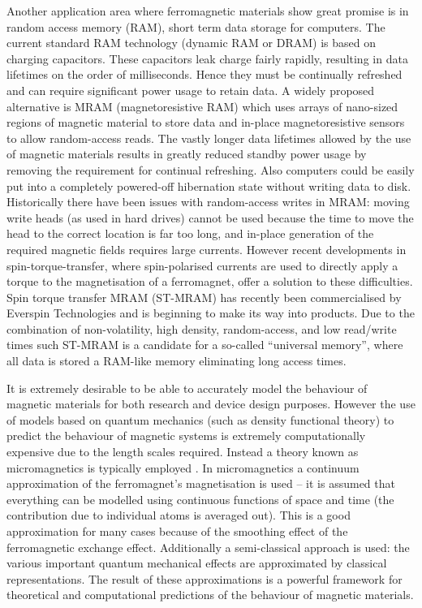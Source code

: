 Another application area where ferromagnetic materials show great promise is in random access memory (RAM), \ie short term data storage for computers.
The current standard RAM technology (dynamic RAM or DRAM) is based on charging capacitors.
These capacitors leak charge fairly rapidly, resulting in data lifetimes on the order of milliseconds.
Hence they must be continually refreshed and can require significant power usage to retain data.
A widely proposed alternative is MRAM (magnetoresistive RAM) which uses arrays of nano-sized regions of magnetic material to store data and in-place magnetoresistive sensors to allow random-access reads.
The vastly longer data lifetimes allowed by the use of magnetic materials results in greatly reduced standby power usage by removing the requirement for continual refreshing.
Also computers could be easily put into a completely powered-off hibernation state without writing data to disk.
Historically there have been issues with random-access writes in MRAM: moving write heads (as used in hard drives) cannot be used because the time to move the head to the correct location is far too long, and in-place generation of the required magnetic fields requires large currents.
However recent developments in spin-torque-transfer, where spin-polarised currents are used to directly apply a torque to the magnetisation of a ferromagnet, offer a solution to these difficulties.
Spin torque transfer MRAM (ST-MRAM) has recently been commercialised by Everspin Technologies \cite{everspin} and is beginning to make its way into products.
Due to the combination of non-volatility, high density, random-access, and low read/write times such ST-MRAM is a candidate for a so-called ``universal memory'', where all data is stored a RAM-like memory eliminating long access times.


It is extremely desirable to be able to accurately model the behaviour of magnetic materials for both research and device design purposes.
However the use of models based on quantum mechanics (such as density functional theory) to predict the behaviour of magnetic systems is extremely computationally expensive due to the length scales required.
Instead a theory known as micromagnetics is typically employed \cite{Aharoni1996}.
In micromagnetics a continuum approximation of the ferromagnet's magnetisation is used -- it is  assumed that everything can be modelled using continuous functions of space and time (\ie the contribution due to individual atoms is averaged out).
This is a good approximation for many cases because of the smoothing effect of the ferromagnetic exchange effect.
Additionally a semi-classical approach is used: the various important quantum mechanical effects are approximated by classical representations.
The result of these approximations is a powerful framework for theoretical and computational predictions of the behaviour of magnetic materials.

